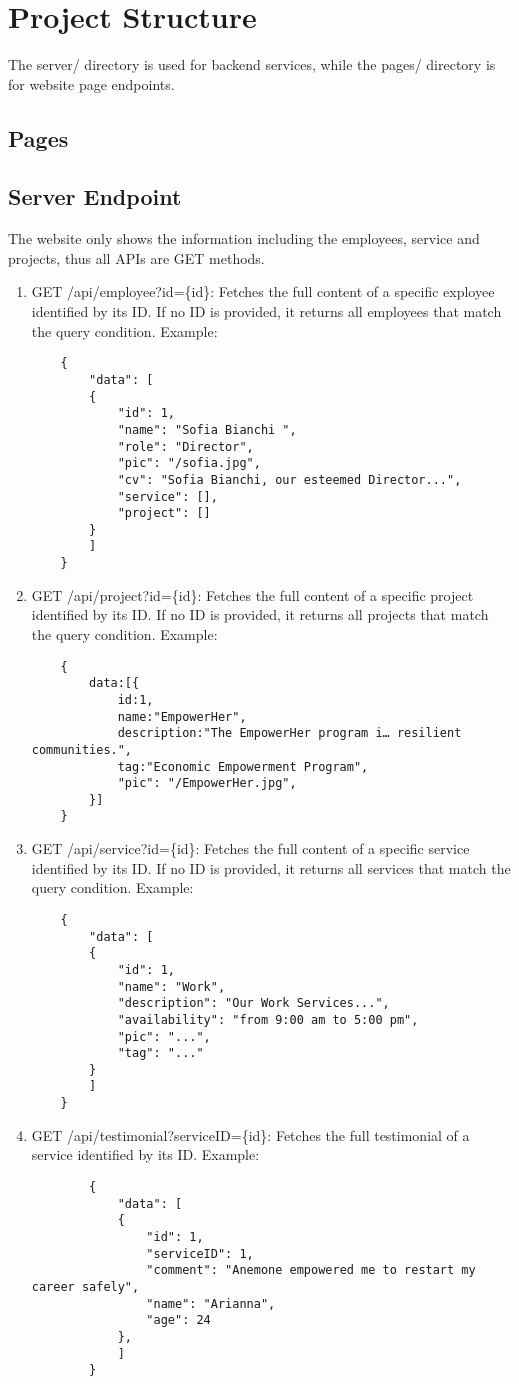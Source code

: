 
\section{Project Structure}
The server/ directory is used for backend services, while the pages/ directory is for website page endpoints.
\subsection{Pages}
\subsection{Server Endpoint}
The website only shows the information including the employees, service and projects, thus all APIs are GET methods.
\begin{enumerate}
	\item GET /api/employee?id=\{id\}: Fetches the full content of a specific exployee identified by its ID. If no ID is provided, it returns all employees that match the query condition.
	Example:
	\begin{verbatim}
	{
		"data": [
		{
			"id": 1,
			"name": "Sofia Bianchi ",
			"role": "Director",
			"pic": "/sofia.jpg",
			"cv": "Sofia Bianchi, our esteemed Director...",
			"service": [],
			"project": []
		}
		]
	}
	\end{verbatim}
	\item GET /api/project?id=\{id\}: Fetches the full content of a specific project identified by its ID. If no ID is provided, it returns all projects that match the query condition. 
	Example:
	\begin{verbatim}
	{
		data:[{	
			id:1,
			name:"EmpowerHer",
			description:"The EmpowerHer program i… resilient communities.",
			tag:"Economic Empowerment Program",
			"pic": "/EmpowerHer.jpg",
		}]
	}
	\end{verbatim}
	\item GET /api/service?id=\{id\}: Fetches the full content of a specific service identified by its ID. If no ID is provided, it returns all services that match the query condition.
	Example:
	\begin{verbatim}
	{
		"data": [
		{
			"id": 1,
			"name": "Work",
			"description": "Our Work Services...",
			"availability": "from 9:00 am to 5:00 pm",
			"pic": "...",
			"tag": "..."
		}
		]
	}
	\end{verbatim}
		\item GET /api/testimonial?serviceID=\{id\}: Fetches the full testimonial of a service identified by its ID.
	Example:
	\begin{verbatim}
		{
			"data": [
			{
				"id": 1,
				"serviceID": 1,
				"comment": "Anemone empowered me to restart my career safely",
				"name": "Arianna",
				"age": 24
			},
			]
		}
	\end{verbatim}
\end{enumerate}